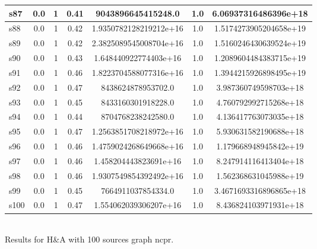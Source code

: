 \documentclass{article}
\begin{document}
\begin{tabular}{|l|c|c|c|c|c|c|}
\hline
s87 &0.0 & 1 & 0.41 & 9043896645415248.0 & 1.0 & 6.06937316486396e+18\\
\hline
s88 &0.0 & 1 & 0.42 & 1.9350782128219212e+16 & 1.0 & 1.5174273905204658e+19\\
\hline
s89 &0.0 & 1 & 0.42 & 2.3825089545008704e+16 & 1.0 & 1.5160246430639524e+19\\
\hline
s90 &0.0 & 1 & 0.43 & 1.648440922774403e+16 & 1.0 & 1.2089604484383715e+19\\
\hline
s91 &0.0 & 1 & 0.46 & 1.8223704588077316e+16 & 1.0 & 1.3944215926898495e+19\\
\hline
s92 &0.0 & 1 & 0.47 & 8438624878953702.0 & 1.0 & 3.987360749598703e+18\\
\hline
s93 &0.0 & 1 & 0.45 & 8433160301918228.0 & 1.0 & 4.760792992715268e+18\\
\hline
s94 &0.0 & 1 & 0.44 & 8704768238242580.0 & 1.0 & 4.136417763073035e+18\\
\hline
s95 &0.0 & 1 & 0.47 & 1.2563851708218972e+16 & 1.0 & 5.930631582190688e+18\\
\hline
s96 &0.0 & 1 & 0.46 & 1.4759024268649668e+16 & 1.0 & 1.179668948945842e+19\\
\hline
s97 &0.0 & 1 & 0.46 & 1.458204443823691e+16 & 1.0 & 8.247914116413404e+18\\
\hline
s98 &0.0 & 1 & 0.46 & 1.9307549854392492e+16 & 1.0 & 1.562368631045988e+19\\
\hline
s99 &0.0 & 1 & 0.45 & 7664911037854334.0 & 1.0 & 3.4671693316896865e+18\\
\hline
s100 &0.0 & 1 & 0.47 & 1.554062039306207e+16 & 1.0 & 8.436824103971931e+18\\
\hline
\end{tabular}\\

\noindent Results for H\&A with 100 sources graph ncpr.
\end{document}
